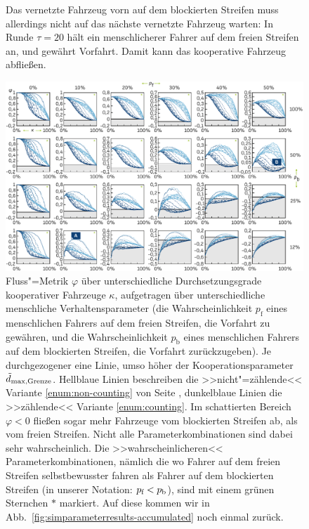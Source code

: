 \begin{figure}
\begin{thinmargin}
{Das vernetzte Fahrzeug vorn auf dem blockierten Streifen muss allerdings nicht auf das nächste vernetzte Fahrzeug warten: In Runde $\tau=20$ hält ein menschlicherer Fahrer auf dem freien Streifen an, und gewährt Vorfahrt. Damit kann das kooperative Fahrzeug abfließen.}%
\label{fig:scenario}%
\end{thinmargin}
\end{figure}




\begin{figure}[t!]%
\begin{thinmargin}
\includegraphics[width=\columnwidth]{content/bottleneck/images/tuev-engstelle-simulation-ergebnisse-7-kamo}%
\caption{Fluss"=Metrik $\varphi$ über unterschiedliche Durchsetzungsgrade kooperativer Fahrzeuge $\kappa$, aufgetragen über unterschiedliche menschliche Verhaltensparameter (die Wahrscheinlichkeit $p_{\text{f}}$ eines menschlichen Fahrers auf dem freien Streifen, die Vorfahrt zu gewähren, und die Wahrscheinlichkeit $p_{\text{b}}$ eines menschlichen Fahrers auf dem blockierten Streifen, die Vorfahrt zurückzugeben). Je durchgezogener eine Linie, umso höher der Kooperationsparameter $\tilde{d}_{\text{max,Grenze}}$. Hellblaue Linien beschreiben die >>nicht"=zählende<< Variante \ref{enum:non-counting} von Seite \pageref{enum:counting}, dunkelblaue Linien die >>zählende<< Variante \ref{enum:counting}. Im schattierten Bereich $\varphi < 0$ fließen sogar mehr Fahrzeuge vom blockierten Streifen ab, als vom freien Streifen. Nicht alle Parameterkombinationen sind dabei sehr wahrscheinlich. Die >>wahrscheinlicheren<< Parameterkombinationen, nämlich die wo Fahrer auf dem freien Streifen selbstbewusster fahren als Fahrer auf dem blockierten Streifen (in unserer Notation: $p_{\text{f}} < p_{\text{b}}$), sind mit einem grünen Sternchen \textcolor{colorPRGreen}{$*$} markiert. Auf diese kommen wir in Abb.~\ref{fig:simparameterresults-accumulated} noch einmal zurück.}%
\label{fig:simparameterresults}%
\end{thinmargin}
\end{figure}












